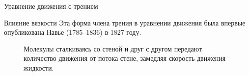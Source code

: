 \begin{chapter}{Уравнение движения с трением}
\begin{section}{Влияние вязкости}
Эта форма члена трения в уравнении движения была впервые опубликована
Навье (1785--1836) в 1827 году.

\begin{figure}[t!]
\caption{Молекулы сталкиваясь со стеной и друг с другом передают
количество движения от потока стене, замедляя скорость движения
жидкости.}
\label{fig:viscositysketch}
\end{figure}
%
%


\end{section}
\end{chapter}
